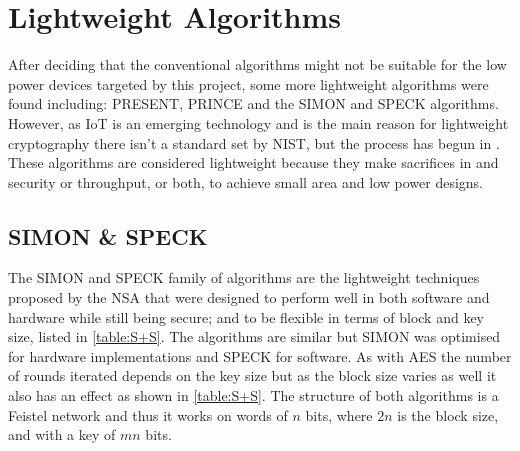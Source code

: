 \documentclass[12pt,twoside,a4paper]{report}
\begin{document}
    \section{Lightweight Algorithms}
    \label{section:light}
    After deciding that the conventional algorithms might not be suitable for the low power devices targeted by this project, some more lightweight algorithms were found including: PRESENT\cite{Bogdanov2007}, PRINCE\cite{Borghoff2012} and the SIMON and SPECK algorithms\cite{Beaulieu2013}. However, as IoT is an emerging technology and is the main reason for lightweight cryptography there isn't a standard set by NIST, but the process has begun in \cite{Mckay}. These algorithms are considered lightweight because they make sacrifices in and security or throughput, or both, to achieve small area and low power designs.
    
    \subsection{SIMON \& SPECK}
    The SIMON and SPECK family of algorithms are the lightweight techniques proposed by the NSA that were designed to perform well in both software and hardware while still being secure; and to be flexible in terms of block and key size, listed in \autoref{table:S+S}.
    The algorithms are similar but SIMON was optimised for hardware implementations and SPECK for software.
    As with AES the number of rounds iterated depends on the key size but as the block size varies as well it also has an effect as shown in \autoref{table:S+S}.
    The structure of both algorithms is a Feistel network and thus it works on words of $n$ bits, where $2n$ is the block size, and with a key of $mn$ bits.
    
\end{document}
